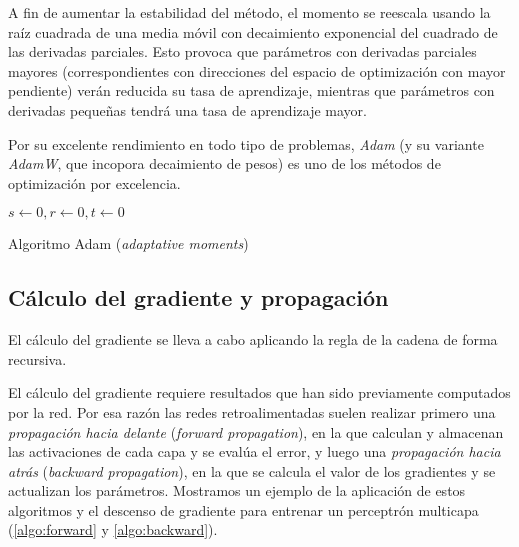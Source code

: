 A fin de aumentar la estabilidad del método, el momento se reescala usando la raíz cuadrada de una media móvil con decaimiento exponencial del cuadrado de las derivadas parciales. Esto provoca que parámetros con derivadas parciales mayores (correspondientes con direcciones del espacio de optimización con mayor pendiente) verán reducida su tasa de aprendizaje, mientras que parámetros con derivadas pequeñas tendrá una tasa de aprendizaje mayor. 

Por su excelente rendimiento en todo tipo de problemas, \textit{Adam} (y su variante \textit{AdamW}, que incopora decaimiento de pesos) es uno de los métodos de optimización por excelencia.

\begin{algorithm}[tb]
    \SetAlgoLined
    \mydata{$\rho_1, \rho_2 \in [0, 1)$, tasa de decaimiento exponencial}
    $s \gets 0, r \gets 0, t \gets 0$\;
    \caption{Algoritmo Adam (\textit{adaptative moments}) \cite{kingma2014adam}}
    \label{algo:adam}
\end{algorithm}

\subsection{Cálculo del gradiente y propagación}
El cálculo del gradiente se lleva a cabo aplicando la regla de la cadena de forma recursiva. 

El cálculo del gradiente requiere resultados que han sido previamente computados por la red. Por esa razón las redes retroalimentadas suelen realizar primero una \textit{propagación hacia delante} (\textit{forward propagation}), en la que calculan y almacenan las activaciones de cada capa y se evalúa el error, y luego una \textit{propagación hacia atrás} (\textit{backward propagation}), en la que se calcula el valor de los gradientes y se actualizan los parámetros. Mostramos un ejemplo de la aplicación de estos algoritmos y el descenso de gradiente para entrenar un perceptrón multicapa (\cref{algo:forward} y \cref{algo:backward}).

